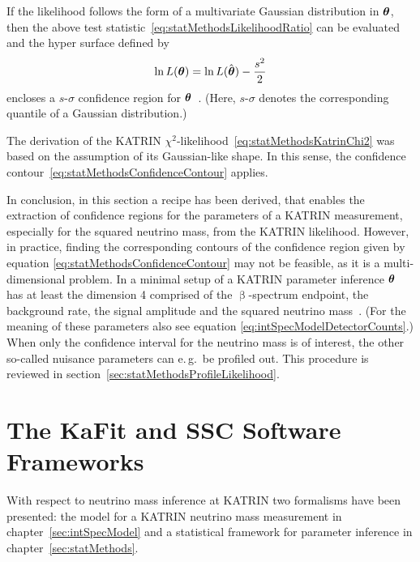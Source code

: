 If the likelihood follows the form of a multivariate Gaussian distribution in $\boldsymbol{\mathbf{\theta}}$, then the above test statistic~\eqref{eq:statMethodsLikelihoodRatio} can be evaluated and the hyper surface defined by
\begin{equation}
	\label{eq:statMethodsConfidenceContour}
	\ln L(\boldsymbol{\mathbf{\theta}}) = 	\ln L(\hat{\boldsymbol{\mathbf{\theta}}}) - \frac{s^2}{2}
\end{equation}
encloses a $s$-$\sigma$ confidence region for $\boldsymbol{\mathbf{\theta}}$~\cite{ReviewOfParticlePhysics}. (Here, $s$-$\sigma$ denotes the corresponding quantile of a Gaussian distribution.) 

The derivation of the KATRIN $\chi^2$-likelihood~\eqref{eq:statMethodsKatrinChi2} was based on the assumption of its Gaussian-like shape. In this sense, the confidence contour~\eqref{eq:statMethodsConfidenceContour} applies. 

In conclusion, in this section a recipe has been derived, that enables the extraction of confidence regions for the parameters of a KATRIN measurement, especially for the squared neutrino mass, from the KATRIN likelihood. However, in practice, finding the corresponding contours of the confidence region given by equation \ref{eq:statMethodsConfidenceContour} may not be feasible, as it is a multi-dimensional problem. In a minimal setup of a KATRIN parameter inference $\boldsymbol{\mathbf{\theta}}$ has at least the dimension 4 comprised of the $\upbeta$-spectrum endpoint, the background rate, the signal amplitude and the squared neutrino mass~\cite{Kleesiek2014}. (For the meaning of these parameters also see equation \eqref{eq:intSpecModelDetectorCounts}.) When only the confidence interval for the neutrino mass is of interest, the other so-called nuisance parameters can e.\,g.~be profiled out. This procedure is reviewed in section~\ref{sec:statMethodsProfileLikelihood}.

\section{The KaFit and SSC Software Frameworks}
\label{sec:statMethodsKaFitSSC}
With respect to neutrino mass inference at KATRIN two formalisms have been presented: the model for a KATRIN neutrino mass measurement in chapter~\ref{sec:intSpecModel} and a statistical framework for parameter inference in chapter~\ref{sec:statMethods}. 

